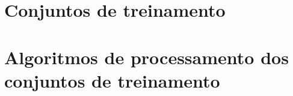 \documentclass[
	12pt,				%
	oneside,			%
	a4paper,			%
	english,			%
	brazil				%
	]{abntex2ppgsi}
\begin{document}
\begin{apendicesenv}


%
%
%




\end{apendicesenv}



\begin{anexosenv}



%
%
%

\chapter{Conjuntos de treinamento}

\chapter{Algoritmos de processamento dos conjuntos de treinamento}

\end{anexosenv}

\end{document}
